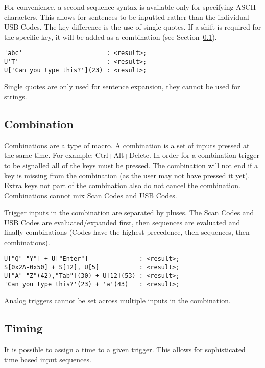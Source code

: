 \documentclass{kiibohd-template}
\begin{document}
For convenience, a second sequence syntax is available only for specifying ASCII characters.
This allows for sentences to be inputted rather than the individual USB Codes.
The key difference is the use of single quotes.
If a shift is required for the specific key, it will be added as a combination (see Section~\ref{subsec:Combination}).

\begin{lstlisting}
'abc'                       : <result>;
U'T'                        : <result>;
U['Can you type this?'](23) : <result>;
\end{lstlisting}

Single quotes are only used for sentence expansion, they cannot be used for strings.


\subsection{Combination}
\label{subsec:Combination}

Combinations are a type of macro.
A combination is a set of inputs pressed at the same time.
For example: Ctrl+Alt+Delete.
In order for a combination trigger to be signalled all of the keys must be pressed.
The combination will not end if a key is missing from the combination (as the user may not have pressed it yet).
Extra keys not part of the combination also do not cancel the combination.
Combinations cannot mix Scan Codes and USB Codes.

Trigger inputs in the combination are separated by pluses.
The Scan Codes and USB Codes are evaluated/expanded first, then sequences are evaluated and finally combinations (Codes have the highest precedence, then sequences, then combinations).

\begin{lstlisting}
U["Q"-"Y"] + U["Enter"]              : <result>;
S[0x2A-0x50] + S[12], U[5]           : <result>;
U["A"-"Z"(42),"Tab"](30) + U[12](53) : <result>;
'Can you type this?'(23) + 'a'(43)   : <result>;
\end{lstlisting}

Analog triggers cannot be set across multiple inputs in the combination.


\subsection{Timing}
\label{subsec:trigtiming}

It is possible to assign a time to a given trigger.
This allows for sophisticated time based input sequences.
\end{document}
